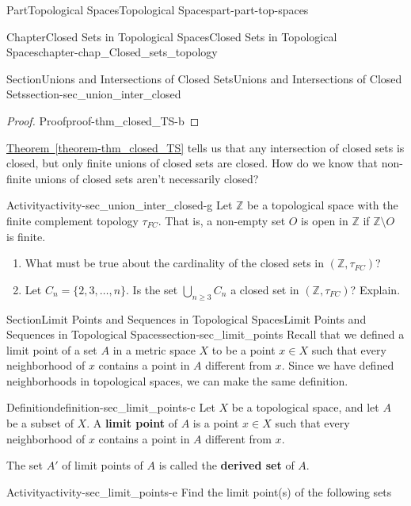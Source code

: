 \documentclass[oneside,10pt,]{book}
\newcommand{\xreffont}{\relax}
\newcommand{\terminology}[1]{\textbf{#1}}
\numberwithin{equation}{chapter}
\newcommand{\Z}{\mathbb{Z}}
\begin{document}
\begin{partptx}{Part}{Topological Spaces}{}{Topological Spaces}{}{}{part-part-top-spaces}
\begin{chapterptx}{Chapter}{Closed Sets in Topological Spaces}{}{Closed Sets in Topological Spaces}{}{}{chapter-chap_Closed_sets_topology}
\begin{sectionptx}{Section}{Unions and Intersections of Closed Sets}{}{Unions and Intersections of Closed Sets}{}{}{section-sec_union_inter_closed}
\begin{proof}{Proof}{}{proof-thm_closed_TS-b}
\end{proof}
\hyperref[theorem-thm_closed_TS]{Theorem~{\xreffont\ref{theorem-thm_closed_TS}}} tells us that any intersection of closed sets is closed, but only finite unions of closed sets are closed. How do we know that non-finite unions of closed sets aren't necessarily closed?%
\begin{activity}{Activity}{}{activity-sec_union_inter_closed-g}%
Let \(\Z\) be a topological space with the finite complement topology \(\tau_{FC}\). That is, a non-empty set \(O\) is open in \(\Z\) if \(\Z \setminus O\) is finite.%
\begin{enumerate}[font=\bfseries,label=(\alph*),ref=\alph*]%
\item{}What must be true about the cardinality of the closed sets in \((\Z, \tau_{FC})\)?%
\item{}Let \(C_n = \{2, 3, \ldots, n\}\). Is the set \(\bigcup_{n \geq 3} C_n\) a closed set in \((\Z, \tau_{FC})\)? Explain.%
\end{enumerate}%
\end{activity}%
\end{sectionptx}
%
%
\typeout{************************************************}
\typeout{************************************************}
%
\begin{sectionptx}{Section}{Limit Points and Sequences in Topological Spaces}{}{Limit Points and Sequences in Topological Spaces}{}{}{section-sec_limit_points}
Recall that we defined a limit point of a set \(A\) in a metric space \(X\) to be a point \(x \in X\) such that every neighborhood of \(x\) contains a point in \(A\) different from \(x\). Since we have defined neighborhoods in topological spaces, we can make the same definition.%
\begin{definition}{Definition}{}{definition-sec_limit_points-c}%
%
Let \(X\) be a topological space, and let \(A\) be a subset of \(X\). A \terminology{limit point} of \(A\) is a point \(x \in X\) such that every neighborhood of \(x\) contains a point in \(A\) different from \(x\).%
\end{definition}
 The set \(A'\) of limit points of \(A\) is called the \terminology{derived set} of \(A\).%
\begin{activity}{Activity}{}{activity-sec_limit_points-e}%
Find the limit point(s) of the following sets%
\begin{enumerate}[font=\bfseries,label=(\alph*),ref=\alph*]%

\end{enumerate}
\end{activity}
\end{sectionptx}
\end{chapterptx}
\end{partptx}
\end{document}
